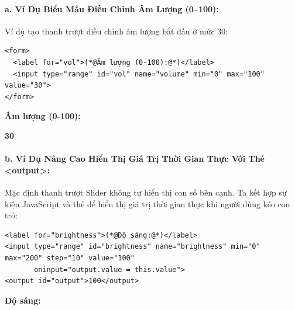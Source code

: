 \paragraph{a. Ví Dụ Biểu Mẫu Điều Chỉnh Âm Lượng (0--100):}
Ví dụ tạo thanh trượt điều chỉnh âm lượng bắt đầu ở mức 30:

\begin{codeWindow}
\begin{lstlisting}[language=HTML5]
<form>
  <label for="vol">(*@Âm lượng (0-100):@*)</label>
  <input type="range" id="vol" name="volume" min="0" max="100" value="30">
</form>
\end{lstlisting}
\end{codeWindow}

\begin{browserWindow}
\sffamily\small
\textbf{Âm lượng (0-100):} \quad
{} \quad \textbf{30}
\end{browserWindow}

\paragraph{b. Ví Dụ Nâng Cao Hiển Thị Giá Trị Thời Gian Thực Với Thẻ <output>:}
Mặc định thanh trượt Slider không tự hiển thị con số bên cạnh. Ta kết hợp sự kiện JavaScript  và thẻ  để hiển thị giá trị thời gian thực khi người dùng kéo con trỏ:

\begin{codeWindow}
\begin{lstlisting}[language=HTML5]
<label for="brightness">(*@Độ sáng:@*)</label>
<input type="range" id="brightness" name="brightness" min="0" max="200" step="10" value="100" 
       oninput="output.value = this.value">
<output id="output">100</output>
\end{lstlisting}
\end{codeWindow}

\begin{browserWindow}
\sffamily\small
\textbf{Độ sáng:} \quad
{} \quad
{}
\end{browserWindow}

